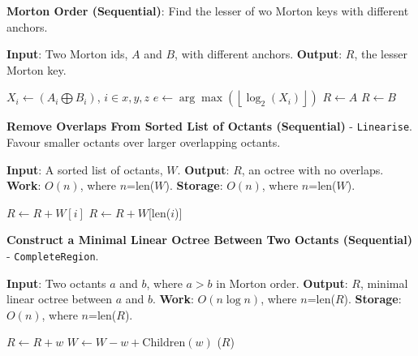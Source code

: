 \begin{algorithm}
    \caption{\textbf{Morton Order (Sequential)}: Find the lesser of wo Morton keys with different anchors.}
    \label{alg:sec_2_4:morton_ordering}
    \begin{algorithmic}
    
        \STATE \textbf{Input}: Two Morton ids, $A$ and $B$, with different anchors.
        \STATE \textbf{Output}: $R$, the lesser Morton key.
        
        \STATE $X_i \gets (A_i \bigoplus B_i)$, $i \in {x, y, z}$
        \STATE $e \gets \arg \max \left ( \left \lfloor \log_2(X_i) \right \rfloor \right )$
            \STATE $R \gets A$
        \ELSE
            \STATE $R \gets B$
        \ENDIF
    \end{algorithmic}
\end{algorithm}
    

\begin{algorithm}
    \caption{\textbf{Remove Overlaps From Sorted List of Octants (Sequential)} - \texttt{Linearise}. Favour smaller octants over larger overlapping octants.}
    \label{alg:sec_2_4:linearise_octree}
    \begin{algorithmic}
    
        \STATE \textbf{Input}: A sorted list of octants, $W$.
        \STATE \textbf{Output}: $R$, an octree with no overlaps.
        \STATE \textbf{Work}: $O(n)$, where $n$=len($W$).
        \STATE \textbf{Storage}: $O(n)$, where $n$=len($W$).
    
                \STATE $R \gets R + W[i]$  
            \ENDIF
        \ENDFOR
        \STATE $R\gets R+W$[len($i$)]
    \end{algorithmic}
\end{algorithm}
    

\begin{algorithm}
    \caption{\textbf{Construct a Minimal Linear Octree Between Two Octants (Sequential)} - \texttt{CompleteRegion}.}
    \label{alg:sec_2_4:complete_region}
    \begin{algorithmic}
        \STATE \textbf{Input}: Two octants $a$ and $b$, where $a > b$ in Morton order. 
        \STATE \textbf{Output}: $R$, minimal linear octree between $a$ and $b$. 
        \STATE \textbf{Work}: $O(n \log n)$, where $n$=len($R$).
        \STATE \textbf{Storage}: $O(n)$, where $n$=len($R$).

                \STATE $R \gets R + w$
                \STATE $W \gets W - w + \text{Children}(w)$
            \ENDIF
        \ENDFOR
        \STATE {}($R$)
    \end{algorithmic}
\end{algorithm}

